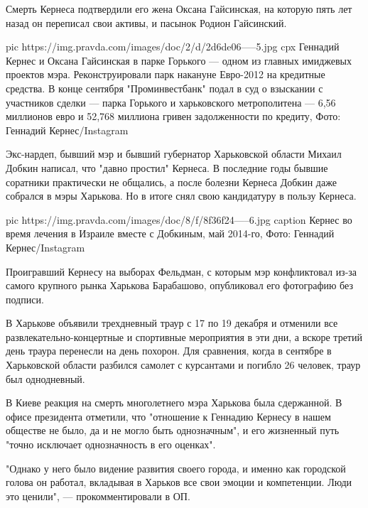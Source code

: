 Смерть Кернеса подтвердили его жена Оксана Гайсинская, на которую пять лет
назад он переписал свои активы, и пасынок Родион Гайсинский.

\ifcmt
pic https://img.pravda.com/images/doc/2/d/2d6de06-----5.jpg
cpx Геннадий Кернес и Оксана Гайсинская в парке Горького — одном из главных имиджевых проектов мэра. Реконструировали парк накануне Евро-2012 на кредитные средства. В конце сентября "Проминвестбанк" подал в суд о взыскании с участников сделки — парка Горького и харьковского метрополитена — 6,56 миллионов евро и 52,768 миллиона гривен задолженности по кредиту, Фото: Геннадий Кернес/Instagram
\fi

Экс-нардеп, бывший мэр и бывший губернатор Харьковской области Михаил Добкин
написал, что "давно простил" Кернеса. В последние годы бывшие соратники
практически не общались, а после болезни Кернеса Добкин даже собрался в мэры
Харькова. Но в итоге снял свою кандидатуру в пользу Кернеса. 

\ifcmt
pic https://img.pravda.com/images/doc/8/f/8f36f24-----6.jpg
caption Кернес во время лечения в Израиле вместе с Добкиным, май 2014-го, Фото: Геннадий Кернес/Instagram
\fi

Проигравший Кернесу на выборах Фельдман, с которым мэр конфликтовал из-за
самого крупного рынка Харькова Барабашово, опубликовал его фотографию без
подписи.

В Харькове объявили трехдневный траур с 17 по 19 декабря и отменили все
развлекательно-концертные и спортивные мероприятия в эти дни, а вскоре третий
день траура перенесли на день похорон. Для сравнения, когда в сентябре в
Харьковской области разбился самолет с курсантами и погибло 26 человек, траур
был однодневный.

В Киеве реакция на смерть многолетнего мэра Харькова была сдержанной. В офисе
президента отметили, что "отношение к Геннадию Кернесу в нашем обществе не
было, да и не могло быть однозначным", и его жизненный путь "точно исключает
однозначность в его оценках".

"Однако у него было видение развития своего города, и именно как городской
голова он работал, вкладывая в Харьков все свои эмоции и компетенции. Люди это
ценили", — прокомментировали в ОП.

